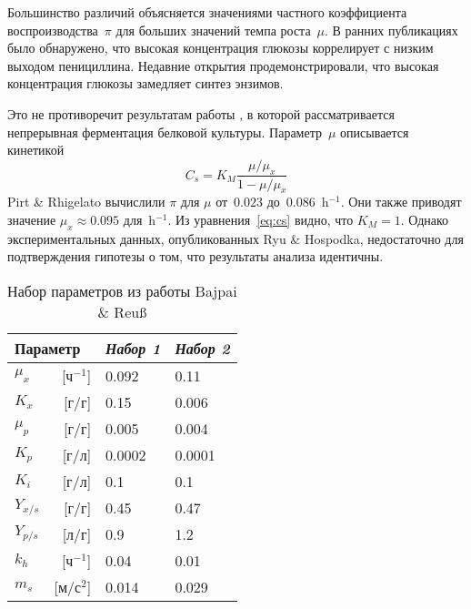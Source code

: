 \documentclass[final,pdftex]{epsilonj}
\numberwithin{equation}{section}
\begin{document}
Большинство различий объясняется значениями частного коэффициента воспроизводства~$\pi$ для больших значений темпа роста~$\mu$. В ранних публикациях \cite{lobanov10,burmistrova10} было обнаружено, что высокая концентрация глюкозы коррелирует с низким выходом пенициллина. Недавние открытия \cite{lobanov10,burmistrova10,romanko02,bonar06} продемонстрировали, что высокая концентрация глюкозы замедляет синтез энзимов.

Это не противоречит результатам работы \cite{risch70}, в которой рассматривается непрерывная ферментация белковой культуры. Параметр~$\mu$ описывается кинетикой
\begin{equation}\label{eq:cs}
    C_{s}  =  K_{M} \frac{\mu/\mu_{x}}{1-\mu/\mu_{x}} 
\end{equation}
Pirt \& Rhigelato вычислили $\pi$ для $\mu$ от~$0.023$ до~$0.086$~h$^{-1}$. Они также приводят значение $\mu_{x} \approx 0.095$ для~h$^{-1}$. Из уравнения~\eqref{eq:cs} видно, что $K_{M}=1$. Однако экспериментальных данных, опубликованных Ryu \& Hospodka, недостаточно для подтверждения гипотезы о том, что результаты анализа идентичны.

\begin{table}
\centering
\begin{tabular}{lrll}
\toprule
\multicolumn{2}{l}{Параметр} & {\it Набор 1} & {\it Набор 2}\\
\midrule
$\mu_{x}$           & [ч$^{-1}$]  & 0.092       & 0.11          \\
$K_{x}$             & [г/г]     & 0.15        & 0.006         \\
$\mu_{p}$           & [г/г]  & 0.005       & 0.004         \\
$K_{p}$             & [г/л]        & 0.0002      & 0.0001        \\
$K_{i}$             & [г/л]        & 0.1         & 0.1           \\
$Y_{x/s}$           & [г/г]     & 0.45        & 0.47          \\
$Y_{p/s}$           & [л/г]        & 0.9         & 1.2           \\
$k_{h}$             & [ч$^{-1}$]  & 0.04        & 0.01          \\
$m_{s}$             & [м/с${}^2$]  & 0.014       & 0.029         \\
\bottomrule
\end{tabular}
\caption{Набор параметров из работы Bajpai \& Reu\ss}\label{tab:parset}
\end{table}
\end{document}
